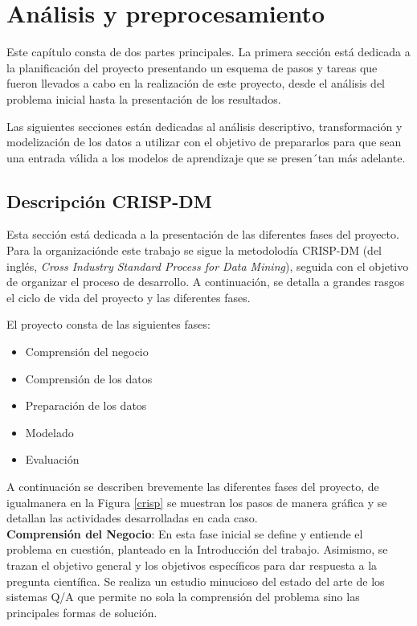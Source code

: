 \chapter{Análisis y preprocesamiento}\label{chapter:methods}

Este capítulo consta de dos partes principales. La primera sección está dedicada a la planificación del proyecto presentando un esquema de pasos y tareas que fueron llevados a cabo en la realización de este proyecto, desde el análisis del problema inicial hasta la presentación de los resultados. 

Las siguientes secciones están dedicadas al análisis descriptivo, transformación y modelización de los datos a utilizar con el objetivo de prepararlos para que sean una entrada válida a los modelos de aprendizaje que se presen´tan más adelante.

\section{Descripción CRISP-DM}

Esta sección está dedicada a la presentación de las diferentes fases del proyecto. Para la organizaciónde este trabajo se sigue la metodolodía CRISP-DM (del inglés, \textit{Cross Industry Standard Process for Data Mining}), seguida con el objetivo de organizar el proceso de desarrollo. A continuación, se detalla a grandes rasgos el ciclo de vida del proyecto y las diferentes fases. 

El proyecto consta de las siguientes fases:

\begin{itemize}
  \item Comprensión del negocio
  \item Comprensión de los datos
  \item Preparación de los datos
  \item Modelado
  \item Evaluación
\end{itemize}

A continuación se describen brevemente las diferentes fases del proyecto, de igualmanera en la Figura \ref{crisp} se muestran los pasos de manera gráfica y se detallan las actividades desarrolladas en cada caso.\\

\textbf{Comprensión del Negocio}: En esta fase inicial se define y entiende el problema en cuestión, planteado en la Introducción del trabajo. Asimismo, se trazan el objetivo general y los objetivos específicos para dar respuesta a la pregunta científica. Se realiza un estudio minucioso del estado del arte de los sistemas Q/A que permite no sola la comprensión del problema sino las principales formas de solución.

